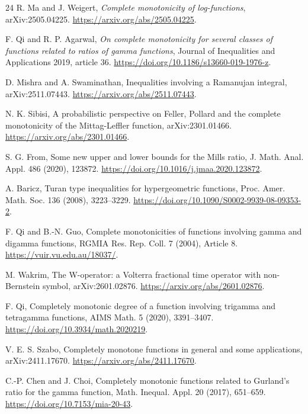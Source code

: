 \documentclass[11pt]{article}
\numberwithin{equation}{section}
\theoremstyle{definition}
\theoremstyle{remark}
\newcommand{\1}{\mathbf 1}
\begin{document}
\begin{thebibliography}{24}
R. Ma and J. Weigert,
\emph{Complete monotonicity of log-functions},
arXiv:2505.04225.
\url{https://arxiv.org/abs/2505.04225}.

F. Qi and R. P. Agarwal,
\emph{On complete monotonicity for several classes of functions related to
ratios of gamma functions},
Journal of Inequalities and Applications 2019, article 36.
\url{https://doi.org/10.1186/s13660-019-1976-z}.


D. Mishra and A. Swaminathan,
\newblock Inequalities involving a Ramanujan integral,
\newblock arXiv:2511.07443.
\url{https://arxiv.org/abs/2511.07443}.

N. K. Sibisi,
\newblock A probabilistic perspective on Feller, Pollard and the complete
  monotonicity of the Mittag-Leffler function,
\newblock arXiv:2301.01466.
\url{https://arxiv.org/abs/2301.01466}.

S. G. From,
\newblock Some new upper and lower bounds for the Mills ratio,
\newblock J. Math. Anal. Appl. 486 (2020), 123872.
\url{https://doi.org/10.1016/j.jmaa.2020.123872}.

A. Baricz,
\newblock Turan type inequalities for hypergeometric functions,
\newblock Proc. Amer. Math. Soc. 136 (2008), 3223--3229.
\url{https://doi.org/10.1090/S0002-9939-08-09353-2}.

F. Qi and B.-N. Guo,
\newblock Complete monotonicities of functions involving gamma and digamma
  functions,
\newblock RGMIA Res. Rep. Coll. 7 (2004), Article 8.
\url{https://vuir.vu.edu.au/18037/}.

M. Wakrim,
\newblock The W-operator: a Volterra fractional time operator with
  non-Bernstein symbol,
\newblock arXiv:2601.02876.
\url{https://arxiv.org/abs/2601.02876}.

F. Qi,
\newblock Completely monotonic degree of a function involving trigamma and
  tetragamma functions,
\newblock AIMS Math. 5 (2020), 3391--3407.
\url{https://doi.org/10.3934/math.2020219}.

V. E. S. Szabo,
\newblock Completely monotone functions in general and some applications,
\newblock arXiv:2411.17670.
\url{https://arxiv.org/abs/2411.17670}.

C.-P. Chen and J. Choi,
\newblock Completely monotonic functions related to Gurland's ratio for the
  gamma function,
\newblock Math. Inequal. Appl. 20 (2017), 651--659.
\url{https://doi.org/10.7153/mia-20-43}.


\end{thebibliography}
\end{document}
